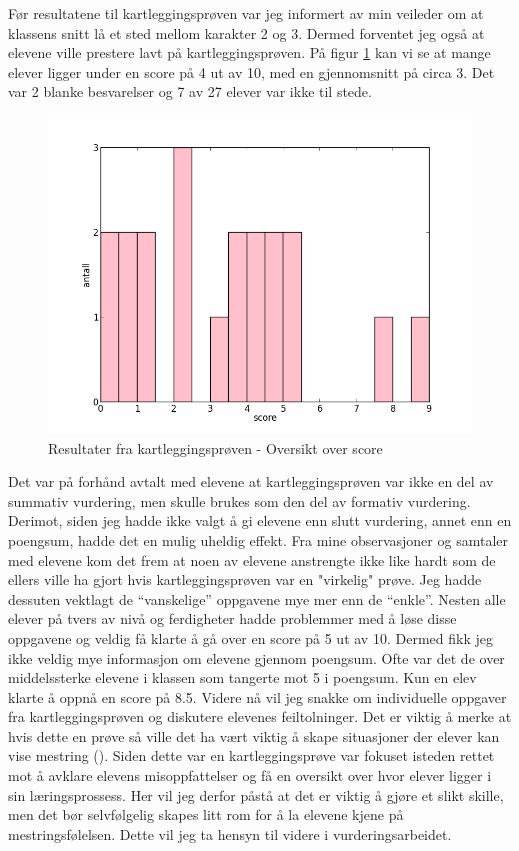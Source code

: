 \documentclass[main.tex]{subfiles}
\begin{document}
Før resultatene til kartleggingsprøven var jeg informert av min veileder om at klassens snitt lå et sted mellom
karakter 2 og 3. Dermed forventet jeg også at elevene ville prestere lavt på kartleggingsprøven. På figur 
\ref{fig:scoreoversikt} kan vi se at mange elever ligger under en score på 4 ut av 10, med en gjennomsnitt 
på circa 3. Det var 2 blanke besvarelser og 7 av 27 elever var ikke til stede.
\begin{figure}[h!]
\centering
\includegraphics[scale = 0.5]{../figures/scoreoversikt.png}
\caption{Resultater fra kartleggingsprøven - Oversikt over score}
\label{fig:scoreoversikt}
\end{figure}

Det var på forhånd avtalt med elevene at kartleggingsprøven var ikke en del av summativ vurdering, men skulle brukes
som den del av formativ vurdering. Derimot, siden jeg hadde ikke valgt å gi elevene enn slutt vurdering, annet enn en 
poengsum, hadde det en mulig uheldig effekt. Fra mine observasjoner og samtaler med elevene kom det frem at noen av 
elevene anstrengte ikke like hardt som de ellers ville ha gjort hvis kartleggingsprøven var en "virkelig" prøve.
Jeg hadde dessuten vektlagt de ``vanskelige'' oppgavene mye mer enn de ``enkle''. Nesten alle elever på tvers av nivå og 
ferdigheter hadde problemmer med å løse disse oppgavene og veldig få klarte å gå over en score på 5 ut av 10. Dermed 
fikk jeg ikke veldig mye informasjon om elevene gjennom poengsum. Ofte var det de over middelssterke elevene i klassen 
som tangerte mot 5 i poengsum. Kun en elev klarte å oppnå en score på 8.5. Videre nå vil jeg snakke om individuelle 
oppgaver fra kartleggingsprøven og diskutere elevenes feiltolninger. Det er viktig å merke at hvis dette en prøve så 
ville det ha vært viktig å skape situasjoner der elever kan vise mestring (). Siden dette var en 
kartleggingsprøve var fokuset isteden rettet mot å avklare elevens misoppfattelser og få en oversikt over hvor
elever ligger i sin læringsprossess. Her vil jeg derfor påstå at det er viktig å gjøre et slikt skille, men det
bør selvfølgelig skapes litt rom for å la elevene kjene på mestringsfølelsen. Dette vil jeg ta hensyn til videre i
vurderingsarbeidet.
\end{document}
